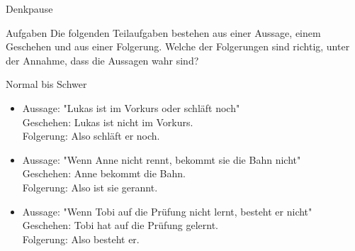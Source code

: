 {
	\begin{frame}{Denkpause}
		\begin{alertblock}{Aufgaben}
			Die folgenden Teilaufgaben bestehen aus einer Aussage, einem Geschehen und aus einer Folgerung. Welche der Folgerungen sind richtig, unter der Annahme, 
			dass die Aussagen wahr sind?
		\end{alertblock}
		\begin{block}{Normal bis Schwer}
			\begin{itemize}
				\item Aussage: "Lukas ist im Vorkurs oder schläft noch"\\
				Geschehen: Lukas ist nicht im Vorkurs.\\
				Folgerung: Also schläft er noch.
				\item Aussage: "Wenn Anne nicht rennt, bekommt sie die Bahn nicht"\\
				Geschehen: Anne bekommt die Bahn.\\
				Folgerung: Also ist sie gerannt.
				\item Aussage: "Wenn Tobi auf die Prüfung nicht lernt, besteht er nicht"\\
				Geschehen: Tobi hat auf die Prüfung gelernt.\\
				Folgerung: Also besteht er.
			\end{itemize}
		\end{block}
	\end{frame}
}
	
